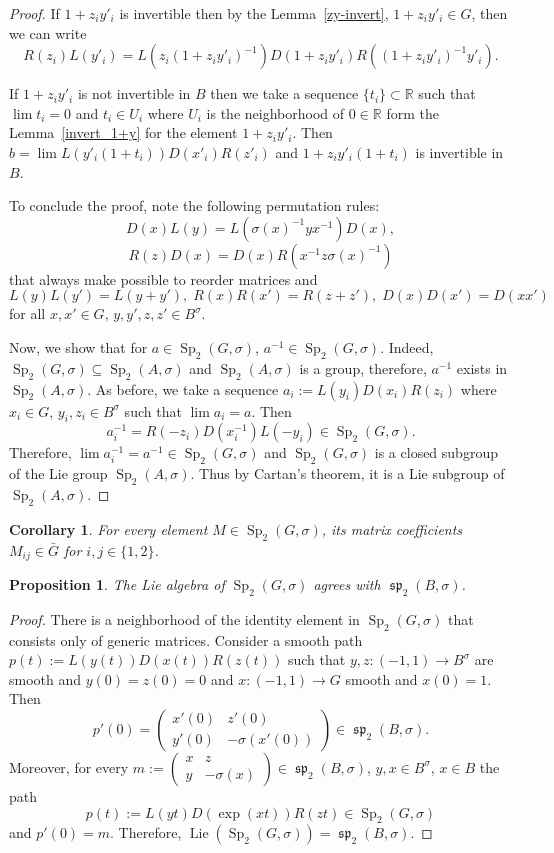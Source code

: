 \documentclass[a4paper,oneside,11pt]{amsart}
\DeclareMathOperator{\Sp}{Sp}
\DeclareMathOperator{\spp}{\mathfrak{sp}}
\DeclareMathOperator{\Lie}{Lie}
\newcommand{\R}{\mathbb R}
\theoremstyle{plain}
\newtheorem{cor}[teo]{Corollary}
\newtheorem{prop}[teo]{Proposition}
\theoremstyle{definition}
\theoremstyle{remark}
\begin{document}
\begin{proof}
If $1+z_iy'_i$ is invertible then by the Lemma~\ref{zy-invert}, $1+z_iy'_i\in G$, then we can write $$R(z_i)L(y'_i)=L(z_i(1+z_iy'_i)^{-1})D(1+z_iy'_i)R((1+z_iy'_i)^{-1}y'_i).$$

If $1+z_iy'_i$ is not invertible in $B$ then we take a sequence $\{t_i\}\subset \R$ such that $\lim t_i =0$ and $t_i\in U_i$ where $U_i$ is the neighborhood of $0\in \R$ form the Lemma~\ref{invert_1+y} for the element $1+z_iy'_i$. Then $b=\lim L(y'_i(1+t_i))D(x'_i)R(z'_i)$ and $1+z_iy'_i(1+t_i)$ is invertible in $B$.

To conclude the proof, note the following permutation rules:
$$D(x)L(y)=L(\sigma(x)^{-1}yx^{-1})D(x),$$
$$R(z)D(x)=D(x)R(x^{-1}z\sigma(x)^{-1})$$
that always make possible to reorder matrices and
$$L(y)L(y')=L(y+y'),\;R(x)R(x')=R(z+z'),\;D(x)D(x')=D(xx')$$
for all $x,x'\in G$, $y,y',z,z'\in B^{\sigma}$.

Now, we show that for $a\in\Sp_2(G,\sigma)$, $a^{-1}\in\Sp_2(G,\sigma)$. Indeed, $\Sp_2(G,\sigma)\subseteq\Sp_2(A,\sigma)$ and $\Sp_2(A,\sigma)$ is a group, therefore, $a^{-1}$ exists in $\Sp_2(A,\sigma)$. As before, we take a sequence $a_i:=L(y_i)D(x_i)R(z_i)$ where $x_i\in G$, $y_i,z_i\in B^{\sigma}$ such that $\lim a_i=a$. Then 
$$a_i^{-1}=R(-z_i)D(x_i^{-1})L(-y_i)\in\Sp_2(G,\sigma).$$ Therefore, $\lim a_i^{-1}=a^{-1}\in\Sp_2(G,\sigma)$ and $\Sp_2(G,\sigma)$ is a closed subgroup of the Lie group $\Sp_2(A,\sigma)$. Thus by Cartan's theorem, it is a Lie subgroup of $\Sp_2(A,\sigma)$.
\end{proof}

\begin{cor}
    For every element $M\in\Sp_2(G,\sigma)$, its matrix coefficients $M_{ij}\in \bar G$ for $i,j\in\{1,2\}$.
\end{cor}

\begin{prop}\label{prop:LieAlgOfSp2}
The Lie algebra of $\Sp_2(G,\sigma)$ agrees with $\spp_2(B,\sigma)$.
\end{prop}

\begin{proof}
There is a neighborhood of the identity element in $\Sp_2(G,\sigma)$ that consists only of generic matrices. Consider a smooth path $p(t):=L(y(t))D(x(t))R(z(t))$ such that $y,z\colon (-1,1)\to B^{\sigma}$ are smooth and $y(0)=z(0)=0$ and $x\colon (-1,1)\to G$ smooth and $x(0)=1$. Then
$$p'(0)=\begin{pmatrix}
    x'(0) & z'(0) \\
    y'(0) & -\sigma(x'(0))
    \end{pmatrix}\in \spp_2(B,\sigma).$$
Moreover, for every $m:=\begin{pmatrix}
    x & z \\
    y & -\sigma(x)
    \end{pmatrix}\in \spp_2(B,\sigma)$, $y,x\in B^{\sigma}$, $x\in B$
the path 
$$p(t):=L(yt)D(\exp(xt))R(zt)\in\Sp_2(G,\sigma)$$
and $p'(0)=m$. Therefore, $\Lie(\Sp_2(G,\sigma))=\spp_2(B,\sigma)$.
\end{proof}
\end{document}
